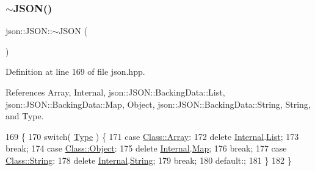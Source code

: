 \subsubsection{\texorpdfstring{$\sim$\+J\+S\+O\+N()}{~JSON()}}
{\footnotesize\ttfamily json\+::\+J\+S\+O\+N\+::$\sim$\+J\+S\+ON (\begin{DoxyParamCaption}{ }\end{DoxyParamCaption})\hspace{0.3cm}{\ttfamily [inline]}}



Definition at line 169 of file json.\+hpp.



References Array, Internal, json\+::\+J\+S\+O\+N\+::\+Backing\+Data\+::\+List, json\+::\+J\+S\+O\+N\+::\+Backing\+Data\+::\+Map, Object, json\+::\+J\+S\+O\+N\+::\+Backing\+Data\+::\+String, String, and Type.


\begin{DoxyCode}
169                 \{
170             \textcolor{keywordflow}{switch}( \mbox{\hyperlink{classjson_1_1_j_s_o_n_a3fa6923afa41bdfe38077fbc0079aaf5}{Type}} ) \{
171             \textcolor{keywordflow}{case} \mbox{\hyperlink{classjson_1_1_j_s_o_n_a762f55df6d407c1af61607ed516ffe07a4410ec34d9e6c1a68100ca0ce033fb17}{Class::Array}}:
172                 \textcolor{keyword}{delete} \mbox{\hyperlink{classjson_1_1_j_s_o_n_a1e2a064794c3d55c8bb8887fc5734947}{Internal}}.\mbox{\hyperlink{unionjson_1_1_j_s_o_n_1_1_backing_data_ab85f5e7ad21f9f7a5407ab73128a3ebc}{List}};
173                 \textcolor{keywordflow}{break};
174             \textcolor{keywordflow}{case} \mbox{\hyperlink{classjson_1_1_j_s_o_n_a762f55df6d407c1af61607ed516ffe07a497031794414a552435f90151ac3b54b}{Class::Object}}:
175                 \textcolor{keyword}{delete} \mbox{\hyperlink{classjson_1_1_j_s_o_n_a1e2a064794c3d55c8bb8887fc5734947}{Internal}}.\mbox{\hyperlink{unionjson_1_1_j_s_o_n_1_1_backing_data_ab2e19b00745b37d2add157ff3a35c431}{Map}};
176                 \textcolor{keywordflow}{break};
177             \textcolor{keywordflow}{case} \mbox{\hyperlink{classjson_1_1_j_s_o_n_a762f55df6d407c1af61607ed516ffe07a27118326006d3829667a400ad23d5d98}{Class::String}}:
178                 \textcolor{keyword}{delete} \mbox{\hyperlink{classjson_1_1_j_s_o_n_a1e2a064794c3d55c8bb8887fc5734947}{Internal}}.\mbox{\hyperlink{unionjson_1_1_j_s_o_n_1_1_backing_data_a883c18d113d2e55767a9530f06a9c772}{String}};
179                 \textcolor{keywordflow}{break};
180             \textcolor{keywordflow}{default}:;
181             \}
182         \}
\end{DoxyCode}
\mbox{\label{classjson_1_1_j_s_o_n_a8720f6a983f53220b3aa3bb9a461edad}} 
